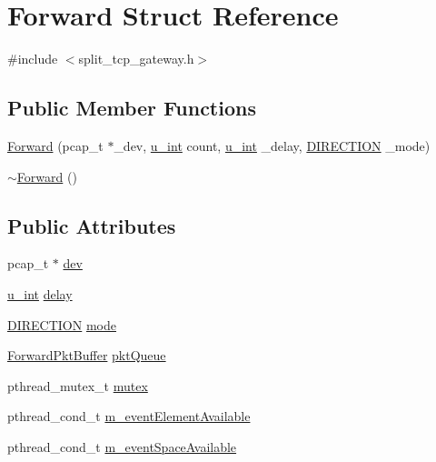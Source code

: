 \hypertarget{structForward}{\section{\-Forward \-Struct \-Reference}
\label{structForward}
}


{\ttfamily \#include $<$split\-\_\-tcp\-\_\-gateway.\-h$>$}

\subsection*{\-Public \-Member \-Functions}
\begin{DoxyCompactItemize}
\item 
\hyperlink{structForward_ae74a6419b39145e74e6b6a30641e3728}{\-Forward} (pcap\-\_\-t $\ast$\-\_\-dev, \hyperlink{split__tcp__gateway_8h_ac319c165d52643e43249fe003e18bdf3}{u\-\_\-int} count, \hyperlink{split__tcp__gateway_8h_ac319c165d52643e43249fe003e18bdf3}{u\-\_\-int} \-\_\-delay, \hyperlink{split__tcp__gateway_8h_aa268a41a13430b18e933ed40207178d0}{\-D\-I\-R\-E\-C\-T\-I\-O\-N} \-\_\-mode)
\item 
\hyperlink{structForward_af018f03fdfd0e58c653bbb8411b77ef0}{$\sim$\-Forward} ()
\end{DoxyCompactItemize}
\subsection*{\-Public \-Attributes}
\begin{DoxyCompactItemize}
\item 
pcap\-\_\-t $\ast$ \hyperlink{structForward_a43e491c45dd179910e10c5f2bf9d4f01}{dev}
\item 
\hyperlink{split__tcp__gateway_8h_ac319c165d52643e43249fe003e18bdf3}{u\-\_\-int} \hyperlink{structForward_a67d0465a472fe58ca483f0da0b76f709}{delay}
\item 
\hyperlink{split__tcp__gateway_8h_aa268a41a13430b18e933ed40207178d0}{\-D\-I\-R\-E\-C\-T\-I\-O\-N} \hyperlink{structForward_a59a8b69d061964b2e52646f7a0083214}{mode}
\item 
\hyperlink{structForwardPktBuffer}{\-Forward\-Pkt\-Buffer} \hyperlink{structForward_adbe26a18bde40343ed7c21e282debc08}{pkt\-Queue}
\item 
pthread\-\_\-mutex\-\_\-t \hyperlink{structForward_abb4b4581a071b8a44c708f853771d8ed}{mutex}
\item 
pthread\-\_\-cond\-\_\-t \hyperlink{structForward_ab6d55b3935b255bde55089bfe53fc101}{m\-\_\-event\-Element\-Available}
\item 
pthread\-\_\-cond\-\_\-t \hyperlink{structForward_a1cb73933205227fcc53684e1d9be708e}{m\-\_\-event\-Space\-Available}
\end{DoxyCompactItemize}


